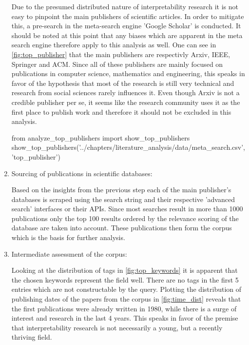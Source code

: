 \begin{enumerate}
	Due to the presumed distributed nature of interpretability research it is not easy to pinpoint the main publishers of scientific articles. In order to mitigate this, a pre-search in the meta-search engine 'Google Scholar' is conducted. It should be noted at this point that any biases which are apparent in the meta search engine therefore apply to this analysis as well. One can see in \autoref{fig:top_publisher} that the main publishers are respectivly Arxiv, IEEE, Springer and ACM. Since all of these publishers are mainly focused on publications in computer science, mathematics and engineering, this speaks in favor of the hypothesis that most of the research is still very technical and research from social sciences rarely influences it. Even though Arxiv is not a credible publisher per se, it seems like the research community uses it as the first place to publish work and therefore it should not be excluded in this analysis. 
	
\begin{pycode}
from analyze_top_publishers import show_top_publishers
show_top_publishers('../chapters/literature_analysis/data/meta_search.csv', 'top_publisher')
\end{pycode}

	\item Sourcing of publications in scientific databases:
	
	Based on the insights from the previous step each of the main publisher's databases is scraped using the search string and their respective 'advanced search' interfaces or their APIs. Since most searches result in more than 1000 publications only the top 100 results ordered by the relevance scoring of the database are taken into account. These publications then form the corpus which is the basis for further analysis.
	
	\item Intermediate assessment of the corpus:
	
	Looking at the distribution of tags in \autoref{fig:top_keywords} it is apparent that the chosen keywords represent the field well. There are no tags in the first 5 entries which are not constructable by the query.
	Plotting the distribution of publishing dates of the papers from the corpus in \autoref{fig:time_dist} reveals that the first publications were already written in 1980, while there is a surge of interest and research in the last 4 years. This speaks in favor of the premise that interpretability research is not necessarily a young, but a recently thriving field.
	

\end{enumerate}
